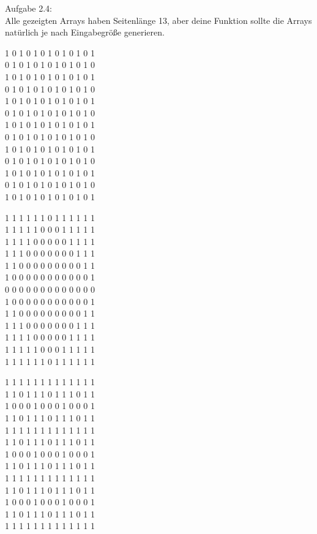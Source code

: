 \documentclass{../../sheet}
\begin{document}
\newpage
{}
\hypertarget{Aufgabe_4}{}
Aufgabe 2.4:\\
Alle gezeigten Arrays haben Seitenlänge 13, aber deine Funktion sollte die Arrays natürlich je nach Eingabegröße generieren.
\begin{ausgabe}
    1 0 1 0 1 0 1 0 1 0 1 0 1 \\
    0 1 0 1 0 1 0 1 0 1 0 1 0 \\
    1 0 1 0 1 0 1 0 1 0 1 0 1 \\
    0 1 0 1 0 1 0 1 0 1 0 1 0 \\
    1 0 1 0 1 0 1 0 1 0 1 0 1 \\
    0 1 0 1 0 1 0 1 0 1 0 1 0 \\
    1 0 1 0 1 0 1 0 1 0 1 0 1 \\
    0 1 0 1 0 1 0 1 0 1 0 1 0 \\
    1 0 1 0 1 0 1 0 1 0 1 0 1 \\
    0 1 0 1 0 1 0 1 0 1 0 1 0 \\
    1 0 1 0 1 0 1 0 1 0 1 0 1 \\
    0 1 0 1 0 1 0 1 0 1 0 1 0 \\
    1 0 1 0 1 0 1 0 1 0 1 0 1
\end{ausgabe}
\begin{ausgabe}
    1 1 1 1 1 1 0 1 1 1 1 1 1 \\
    1 1 1 1 1 0 0 0 1 1 1 1 1 \\
    1 1 1 1 0 0 0 0 0 1 1 1 1 \\
    1 1 1 0 0 0 0 0 0 0 1 1 1 \\
    1 1 0 0 0 0 0 0 0 0 0 1 1 \\
    1 0 0 0 0 0 0 0 0 0 0 0 1 \\
    0 0 0 0 0 0 0 0 0 0 0 0 0 \\
    1 0 0 0 0 0 0 0 0 0 0 0 1 \\
    1 1 0 0 0 0 0 0 0 0 0 1 1 \\
    1 1 1 0 0 0 0 0 0 0 1 1 1 \\
    1 1 1 1 0 0 0 0 0 1 1 1 1 \\
    1 1 1 1 1 0 0 0 1 1 1 1 1 \\
    1 1 1 1 1 1 0 1 1 1 1 1 1
\end{ausgabe}
\begin{ausgabe}
    1 1 1 1 1 1 1 1 1 1 1 1 1 \\
    1 1 0 1 1 1 0 1 1 1 0 1 1 \\
    1 0 0 0 1 0 0 0 1 0 0 0 1 \\
    1 1 0 1 1 1 0 1 1 1 0 1 1 \\
    1 1 1 1 1 1 1 1 1 1 1 1 1 \\
    1 1 0 1 1 1 0 1 1 1 0 1 1 \\
    1 0 0 0 1 0 0 0 1 0 0 0 1 \\
    1 1 0 1 1 1 0 1 1 1 0 1 1 \\
    1 1 1 1 1 1 1 1 1 1 1 1 1 \\
    1 1 0 1 1 1 0 1 1 1 0 1 1 \\
    1 0 0 0 1 0 0 0 1 0 0 0 1 \\
    1 1 0 1 1 1 0 1 1 1 0 1 1 \\
    1 1 1 1 1 1 1 1 1 1 1 1 1
\end{ausgabe}
\end{document}
